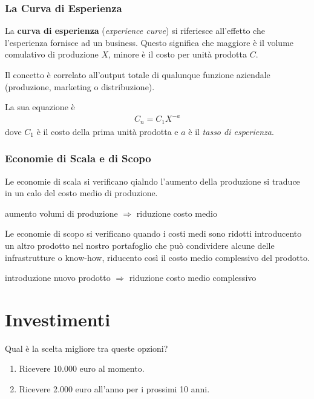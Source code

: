 \documentclass[a4paper,portrait,12pt]{article}
\theoremstyle{definition}
\begin{document}
\subsubsection{La Curva di Esperienza}
La \textbf{curva di esperienza} (\emph{experience curve}) si riferiesce all'effetto che l'esperienza fornisce ad un business.
Questo significa che maggiore è il volume comulativo di produzione $X$, minore è il costo per unità prodotta $C$.

Il concetto è correlato all'output totale di qualunque funzione aziendale (produzione, marketing o distribuzione).

La sua equazione è
\begin{align*}
C_n = C_1 X^{-a}
\end{align*}
dove $C_1$ è il costo della prima unità prodotta e $a$ è il \emph{tasso di esperienza}.


\subsubsection{Economie di Scala e di Scopo}
Le economie di scala si verificano qialndo l'aumento della produzione si traduce in un calo del costo medio di produzione.
\begin{center}
aumento volumi di produzione $\Rightarrow$ riduzione costo medio
\end{center}

Le economie di scopo si verificano quando i costi medi sono ridotti introducento un altro prodotto nel nostro portafoglio che può condividere alcune delle infrastrutture o know-how, riducento così il costo medio complessivo del prodotto.
\begin{center}
introduzione nuovo prodotto $\Rightarrow$ riduzione costo medio complessivo
\end{center}



\newpage
\section{Investimenti}



Qual è la scelta migliore tra queste opzioni?
\begin{enumerate}
\item Ricevere 10.000 euro al momento.
\item Ricevere 2.000 euro all'anno per i prossimi 10 anni.
\end{enumerate}
\end{document}
